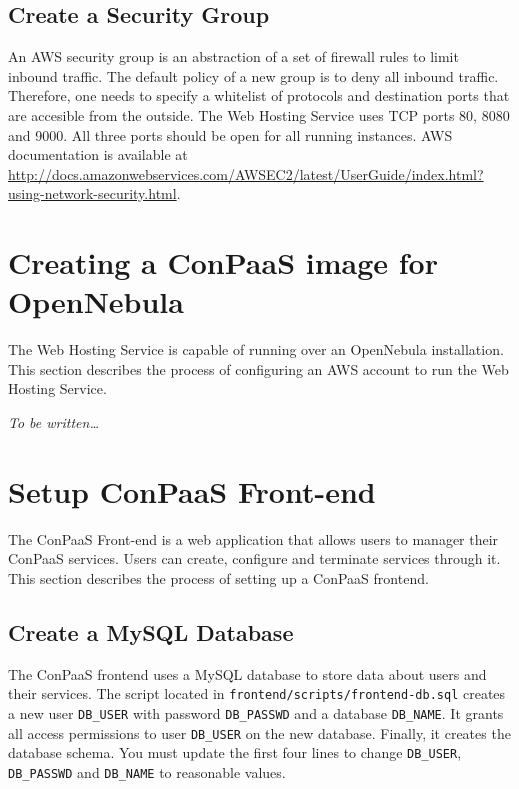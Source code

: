 \documentclass[10pt]{article}
\begin{document}
\subsection{Create a Security Group}

An AWS security group is an abstraction of a set of firewall rules to
limit inbound traffic. The default policy of a new group is to deny
all inbound traffic. Therefore, one needs to specify a whitelist of
protocols and destination ports that are accesible from the outside.
The Web Hosting Service uses TCP ports 80, 8080 and 9000. All three
ports should be open for all running instances.  AWS documentation is
available at
\url{http://docs.amazonwebservices.com/AWSEC2/latest/UserGuide/index.html?using-network-security.html}.

\section{Creating a ConPaaS image for OpenNebula}

The Web Hosting Service is capable of running over an OpenNebula
installation. This section describes the process of configuring an AWS
account to run the Web Hosting Service.

\emph{To be written\ldots}

\section{Setup ConPaaS Front-end}

The ConPaaS Front-end is a web application that allows users to
manager their ConPaaS services. Users can create, configure and
terminate services through it. This section describes the process of
setting up a ConPaaS frontend.

\subsection{Create a MySQL Database}

The ConPaaS frontend uses a MySQL database to store data about users
and their services. The script located in
\verb+frontend/scripts/frontend-db.sql+ creates a new user
\verb+DB_USER+ with password \verb+DB_PASSWD+ and a database
\verb+DB_NAME+. It grants all access permissions to user
\verb+DB_USER+ on the new database. Finally, it creates the database
schema. You must update the first four lines to change \verb+DB_USER+,
\verb+DB_PASSWD+ and \verb+DB_NAME+ to reasonable values.
\end{document}

